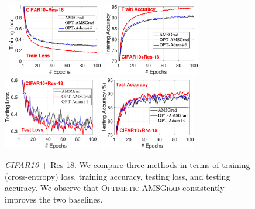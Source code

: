 \documentclass[11pt]{article}
\theoremstyle{k}
\begin{document}
\begin{figure}[h]
\begin{center}
\mbox{
\includegraphics[width=1.65in]{./new_figure/cifar10_train_loss_disz.eps}\hspace{-0.1in}
\includegraphics[width=1.65in]{./new_figure/cifar10_train_acc_disz.eps}
}
\mbox{
\includegraphics[width=1.65in]{./new_figure/cifar10_test_loss_disz.eps}\hspace{-0.1in}
\includegraphics[width=1.65in]{./new_figure/cifar10_test_acc_disz.eps}
}
\end{center}
\caption{\textit{CIFAR10} + Res-18. We compare three methods in terms of training (cross-entropy) loss, training accuracy, testing loss, and testing accuracy. We observe that \textsc{Optimistic-AMSGrad} consistently improves the two baselines.} \label{figs:CIFAR10_new3}
\end{figure}
\end{document}
